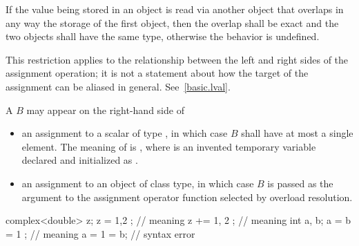 \pnum
If the value being stored in an object is read via another object that
overlaps in any way the storage of the first object, then the overlap shall be
exact and the two objects shall have the same type, otherwise the behavior is
undefined.
%
%
%
%
%
\begin{note}
This restriction applies to the relationship
between the left and right sides of the assignment operation; it is not a
statement about how the target of the assignment can be aliased in general.
See~\ref{basic.lval}.
\end{note}

\pnum
A  $B$ may appear on the right-hand side of

\begin{itemize}
\item
an assignment to a scalar of type , in which case $B$
shall have at most a single element.
The meaning of  is ,
where  is an invented temporary variable
declared and initialized as .

\item
an assignment to an object of class type, in which case $B$
is passed as the argument to the assignment operator function selected by
overload resolution.
\end{itemize}

\begin{example}
\begin{codeblock}
complex<double> z;
z = { 1,2 };        // meaning 
z += { 1, 2 };      // meaning 
int a, b;
a = b = { 1 };      // meaning 
a = { 1 } = b;      // syntax error
\end{codeblock}
\end{example}

